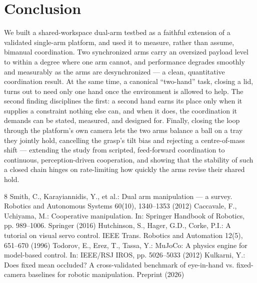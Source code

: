 \documentclass[runningheads]{llncs}
\begin{document}
\section{Conclusion}
We built a shared-workspace dual-arm testbed as a faithful extension of a validated single-arm platform, and used it to measure, rather than assume, bimanual coordination. Two synchronized arms carry an oversized payload level to within a degree where one arm cannot, and performance degrades smoothly and measurably as the arms are desynchronized --- a clean, quantitative coordination result. At the same time, a canonical ``two-hand'' task, closing a lid, turns out to need only one hand once the environment is allowed to help. The second finding disciplines the first: a second hand earns its place only when it supplies a constraint nothing else can, and when it does, the coordination it demands can be stated, measured, and designed for. Finally, closing the loop through the platform's own camera lets the two arms balance a ball on a tray they jointly hold, cancelling the grasp's tilt bias and rejecting a centre-of-mass shift --- extending the study from scripted, feed-forward coordination to continuous, perception-driven cooperation, and showing that the stability of such a closed chain hinges on rate-limiting how quickly the arms revise their shared hold.


\begin{thebibliography}{8}
 Smith, C., Karayiannidis, Y., et al.: Dual arm manipulation --- a survey.
Robotics and Autonomous Systems 60(10), 1340--1353 (2012)
 Caccavale, F., Uchiyama, M.: Cooperative manipulation. In: Springer
Handbook of Robotics, pp. 989--1006. Springer (2016)
 Hutchinson, S., Hager, G.D., Corke, P.I.: A tutorial on visual servo
control. IEEE Trans. Robotics and Automation 12(5), 651--670 (1996)
 Todorov, E., Erez, T., Tassa, Y.: MuJoCo: A physics engine for
model-based control. In: IEEE/RSJ IROS, pp. 5026--5033 (2012)
 Kulkarni, Y.: Does fixed mean occluded? A cross-validated benchmark of
eye-in-hand vs. fixed-camera baselines for robotic manipulation. Preprint (2026)
\end{thebibliography}
\end{document}

